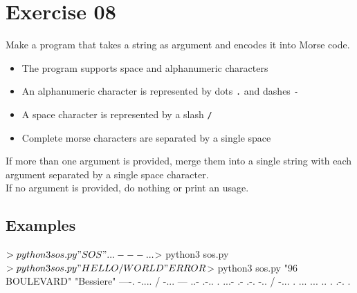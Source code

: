 \chapter{Exercise 08}
\makeheaderfilesforbidden
Make a program that takes a string as argument and encodes it into Morse code.
\begin{itemize}
	\item The program supports space and alphanumeric characters
	\item An alphanumeric character is represented by dots \texttt{.} and dashes \texttt{-}
	\item A space character is represented by a slash \texttt{/}
	\item Complete morse characters are separated by a single space\\
\end{itemize}
If more than one argument is provided, merge them into a single string with each argument separated by a single space character.\\
\newline
If no argument is provided, do nothing or print an usage.

\section*{Examples}
\begin{42console}
	$> python3 sos.py "SOS"
	... --- ...
	$> python3 sos.py
	$> python3 sos.py "HELLO / WORLD"
	ERROR

	$> python3 sos.py "96 BOULEVARD" "Bessiere"
	----. -.... / -... --- ..- .-.. . ...- .- .-. -.. / -... . ... ... .. . .-. .
\end{42console}

